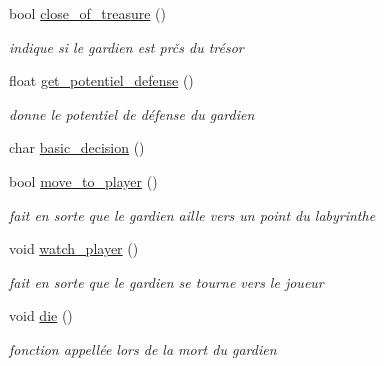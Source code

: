 \begin{DoxyCompactItemize}
bool \hyperlink{classGardien_a8563417984b4aa5416ade0d8650e5f00}{close\+\_\+of\+\_\+treasure} ()
\begin{DoxyCompactList}\small\item\em indique si le gardien est prčs du trésor \end{DoxyCompactList}\item 
float \hyperlink{classGardien_acb0376cc8fd56e65812e23bf32eaa31c}{get\+\_\+potentiel\+\_\+defense} ()
\begin{DoxyCompactList}\small\item\em donne le potentiel de défense du gardien \end{DoxyCompactList}\item 
char \hyperlink{classGardien_afd0c3eba7264ae8fce2f92cae359dfdb}{basic\+\_\+decision} ()
\item 
bool \hyperlink{classGardien_accc4aeb42df9851b31bea75b9a06807b}{move\+\_\+to\+\_\+player} ()
\begin{DoxyCompactList}\small\item\em fait en sorte que le gardien aille vers un point du labyrinthe \end{DoxyCompactList}\item 
void \hyperlink{classGardien_ae4f3ed71c1b37ed1e6c3b39ffd16d3fa}{watch\+\_\+player} ()
\begin{DoxyCompactList}\small\item\em fait en sorte que le gardien se tourne vers le joueur \end{DoxyCompactList}\item 
void \hyperlink{classGardien_a17d57e80bce205161c98c557bb6e7a9c}{die} ()
\begin{DoxyCompactList}\small\item\em fonction appellée lors de la mort du gardien \end{DoxyCompactList}\end{DoxyCompactItemize}
